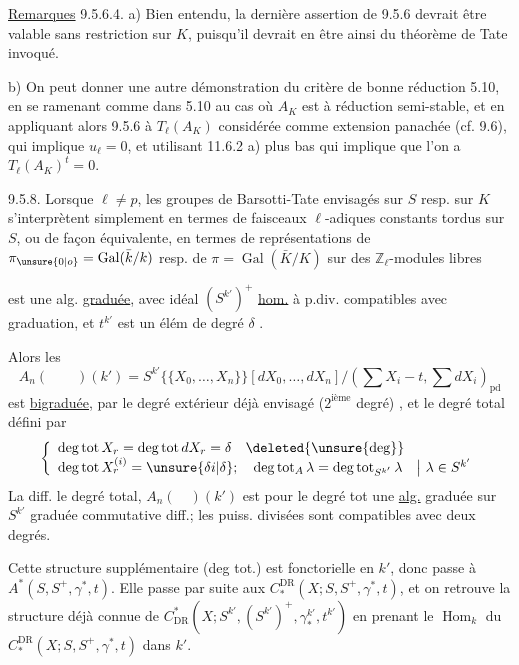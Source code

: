 \uline{Remarques} 9.5.6.4. a) Bien entendu, la dernière assertion de 9.5.6 devrait être valable sans restriction sur $K$, puisqu'il devrait en être ainsi du théorème de Tate invoqué.

b) On peut donner une autre démonstration du critère de bonne réduction 5.10, en se ramenant comme dans 5.10 au cas où $A_K$ est à réduction semi-stable, et en appliquant alors 9.5.6 à $T_\ell(A_K)$ considérée comme extension panachée (cf. 9.6), qui implique $u_\ell=0$, et utilisant 11.6.2 a) plus bas qui implique que l'on a $T_\ell(A_K)^t=0$.

9.5.8. Lorsque $\ell\neq p$, les groupes de Barsotti-Tate envisagés sur $S$ resp. sur $K$ s'interprètent simplement en termes de faisceaux $\ell$-adiques constants tordus sur $S$, ou de façon équivalente, en termes de représentations de $\pi_{\unsure{0|o}}=\operatorname{Gal}(\bar k/k)$ resp. de $\pi=\operatorname{Gal}(\bar K/K)$ sur des $\mathbb Z_\ell$-modules libres


est une alg.  \uline{graduée}, avec idéal $(S^{k'})^+$ \uline{hom.} à p.div. compatibles avec graduation, et $t^{k'}$ est un élém de degré $\delta$ .

Alors les
\[
 A_n(\qquad)(k')=S^{k'}\{\{X_0,\ldots,X_n\}\}[dX_0,\ldots,dX_n]/(\textstyle\sum X_i-t,\sum dX_i)_{\mathrm{pd}}
\]
 est \uline{bigraduée}, par le degré extérieur déjà envisagé ($2^{\text{ième}}$ degré) , et le degré total défini par
\[
\left\{\begin{array}{l}
\deg\operatorname{tot}X_r=\deg\operatorname{tot}dX_r=\delta\quad\deleted{\unsure{\deg}}\\
\deg\operatorname{tot}X_r^{(i)}=\unsure{\delta i|\delta};\quad\deg\operatorname{tot}_A\lambda=\deg\operatorname{tot}_{S^{k'}}\lambda\quad\big|\ \lambda\in S^{k'}
\end{array}\right.
\]
La diff.   le degré total, $A_n(\quad)(k')$ est pour le degré tot une \uline{alg.} graduée sur $S^{k'}$ graduée commutative diff.; les puiss. divisées sont compatibles avec deux degrés.

Cette structure supplémentaire (deg tot.) est  fonctorielle en $k'$, donc passe à $A^*(S,S^+,\gamma^*,t)$. Elle passe par suite aux $C_*^{\mathrm{DR}}(X;S,S^+,\gamma^*,t)$, et on retrouve la structure déjà connue de $C^*_{\mathrm{DR}}(X;S^{k'},(S^{k'})^+,\gamma_*^{k'},t^{k'})$ en prenant le $\operatorname{Hom}_k$ du  $C_*^{\mathrm{DR}}(X;S,S^+,\gamma^*,t)$ dans $k'$.

